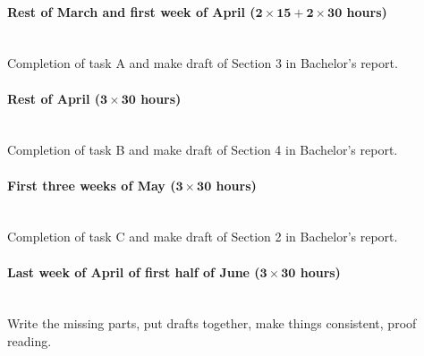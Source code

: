\documentclass{article}
\newcommand{\timeest}[1]{$\mathbf{#1}$}%
\begin{document}
\paragraph{Rest of March and first week of April (\timeest{2\times 15+2\times 30} hours)}~\\\noindent
Completion of task A and make draft of Section 3 in Bachelor's report.

\paragraph{Rest of April (\timeest{3\times 30} hours)}~\\\noindent
Completion of task B and make draft of Section 4 in Bachelor's report.

\paragraph{First three weeks of May (\timeest{3\times 30} hours)}~\\\noindent
Completion of task C and make draft of Section 2 in Bachelor's report.

\paragraph{Last week of April of first half of June (\timeest{3\times 30} hours)}~\\\noindent
Write the missing parts, put drafts together, make things consistent, proof reading.
\end{document}
